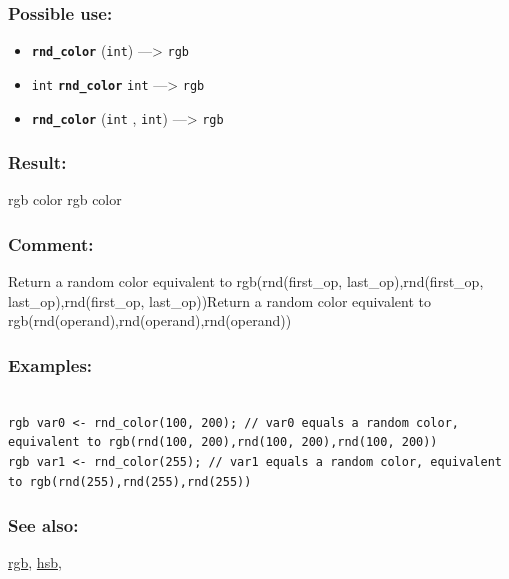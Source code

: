 \documentclass[]{book}
\providecommand{\tightlist}{%
  \setlength{\itemsep}{0pt}\setlength{\parskip}{0pt}}
\theoremstyle{definition}
\theoremstyle{definition}
\theoremstyle{definition}
\theoremstyle{remark}
\begin{document}
\subsubsection{Possible use:}\label{possible-use-443}

\begin{itemize}
\tightlist
\item
  \textbf{\texttt{rnd\_color}} (\texttt{int}) ---\textgreater{}
  \texttt{rgb}
\item
  \texttt{int} \textbf{\texttt{rnd\_color}} \texttt{int}
  ---\textgreater{} \texttt{rgb}
\item
  \textbf{\texttt{rnd\_color}} (\texttt{int} , \texttt{int})
  ---\textgreater{} \texttt{rgb}
\end{itemize}

\subsubsection{Result:}\label{result-429}

rgb color rgb color

\subsubsection{Comment:}\label{comment-86}

Return a random color equivalent to rgb(rnd(first\_op,
last\_op),rnd(first\_op, last\_op),rnd(first\_op, last\_op))Return a
random color equivalent to rgb(rnd(operand),rnd(operand),rnd(operand))

\subsubsection{Examples:}\label{examples-304}

\begin{verbatim}
 
rgb var0 <- rnd_color(100, 200); // var0 equals a random color, equivalent to rgb(rnd(100, 200),rnd(100, 200),rnd(100, 200)) 
rgb var1 <- rnd_color(255); // var1 equals a random color, equivalent to rgb(rnd(255),rnd(255),rnd(255))
\end{verbatim}

\subsubsection{See also:}\label{see-also-178}

\href{operators-n-to-r.html\#rgb}{rgb},
\href{operators-d-to-h.html\#hsb}{hsb},
\end{document}
